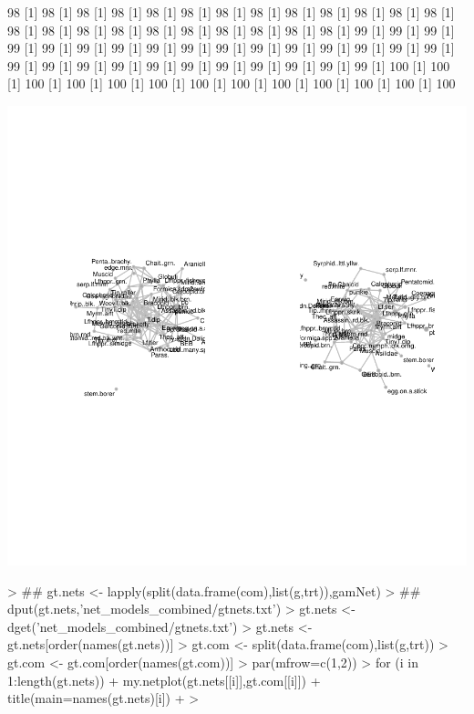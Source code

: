 \documentclass[12pt]{article}
\begin{document}
\begin{Schunk}
\begin{Soutput}
[1] 98%
[1] 98%
[1] 98%
[1] 98%
[1] 98%
[1] 98%
[1] 98%
[1] 98%
[1] 98%
[1] 98%
[1] 98%
[1] 98%
[1] 98%
[1] 98%
[1] 98%
[1] 98%
[1] 98%
[1] 98%
[1] 98%
[1] 98%
[1] 98%
[1] 98%
[1] 98%
[1] 99%
[1] 99%
[1] 99%
[1] 99%
[1] 99%
[1] 99%
[1] 99%
[1] 99%
[1] 99%
[1] 99%
[1] 99%
[1] 99%
[1] 99%
[1] 99%
[1] 99%
[1] 99%
[1] 99%
[1] 99%
[1] 99%
[1] 99%
[1] 99%
[1] 99%
[1] 99%
[1] 99%
[1] 99%
[1] 99%
[1] 99%
[1] 100%
[1] 100%
[1] 100%
[1] 100%
[1] 100%
[1] 100%
[1] 100%
[1] 100%
[1] 100%
[1] 100%
[1] 100%
[1] 100%
[1] 100%
\end{Soutput}
\end{Schunk}
\includegraphics{pb_removal-028}

\begin{Schunk}
\begin{Sinput}
> ## gt.nets <- lapply(split(data.frame(com),list(g,trt)),gamNet)
> ## dput(gt.nets,'net_models_combined/gtnets.txt')
> gt.nets <- dget('net_models_combined/gtnets.txt')
> gt.nets <- gt.nets[order(names(gt.nets))]
> gt.com <- split(data.frame(com),list(g,trt))
> gt.com <- gt.com[order(names(gt.com))]
> par(mfrow=c(1,2))
> for (i in 1:length(gt.nets)){
+   my.netplot(gt.nets[[i]],gt.com[[i]])
+   title(main=names(gt.nets)[i])
+ }
> 
\end{Sinput}
\end{Schunk}
\end{document}
